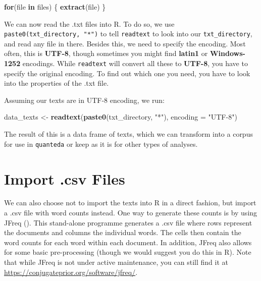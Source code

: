 \documentclass[
]{book}
\newenvironment{Shaded}{\begin{snugshade}}{\end{snugshade}}
\newcommand{\AttributeTok}[1]{\textcolor[rgb]{0.13,0.29,0.53}{#1}}
\newcommand{\ControlFlowTok}[1]{\textcolor[rgb]{0.13,0.29,0.53}{\textbf{#1}}}
\newcommand{\FunctionTok}[1]{\textcolor[rgb]{0.13,0.29,0.53}{\textbf{#1}}}
\newcommand{\NormalTok}[1]{#1}
\newcommand{\OtherTok}[1]{\textcolor[rgb]{0.56,0.35,0.01}{#1}}
\newcommand{\StringTok}[1]{\textcolor[rgb]{0.31,0.60,0.02}{#1}}
\begin{document}
\begin{Shaded}
\begin{Highlighting}[]
\ControlFlowTok{for}\NormalTok{(file }\ControlFlowTok{in}\NormalTok{ files) \{}
 \FunctionTok{extract}\NormalTok{(file)}
\NormalTok{\}}
\end{Highlighting}
\end{Shaded}

We can now read the .txt files into R. To do so, we use \texttt{paste0(txt\_directory,\ "*")} to tell \texttt{readtext} to look into our \texttt{txt\_directory}, and read any file in there. Besides this, we need to specify the encoding. Most often, this is \textbf{UTF-8}, though sometimes you might find \textbf{latin1} or \textbf{Windows-1252} encodings. While \texttt{readtext} will convert all these to \textbf{UTF-8}, you have to specify the original encoding. To find out which one you need, you have to look into the properties of the .txt file.

Assuming our texts are in UTF-8 encoding, we run:

\begin{Shaded}
\begin{Highlighting}[]
\NormalTok{data\_texts }\OtherTok{\textless{}{-}} \FunctionTok{readtext}\NormalTok{(}\FunctionTok{paste0}\NormalTok{(txt\_directory, }\StringTok{"*"}\NormalTok{), }\AttributeTok{encoding =} \StringTok{"UTF{-}8"}\NormalTok{)}
\end{Highlighting}
\end{Shaded}

The result of this is a data frame of texts, which we can transform into a corpus for use in \texttt{quanteda} or keep as it is for other types of analyses.

\section{Import .csv Files}\label{import-.csv-files}

We can also choose not to import the texts into R in a direct fashion, but import a .csv file with word counts instead. One way to generate these counts is by using JFreq (). This stand-alone programme generates a .csv file where rows represent the documents and columns the individual words. The cells then contain the word counts for each word within each document. In addition, JFreq also allows for some basic pre-processing (though we would suggest you do this in R). Note that while JFreq is not under active maintenance, you can still find it at \url{https://conjugateprior.org/software/jfreq/}.
\end{document}
